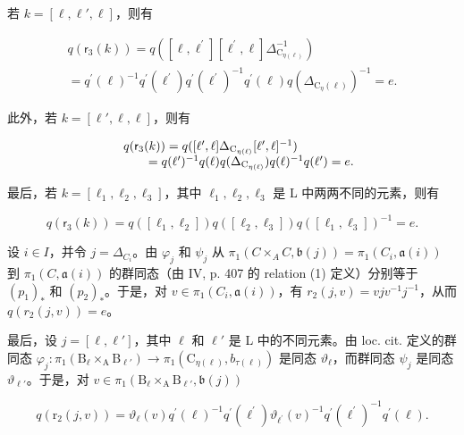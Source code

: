 若 \(k = [\ell, \ell', \ell]\)，则有

\[
\begin{array}{c} q (\mathsf {r} _ {3} (k)) = q ([ \ell , \ell^ {\prime} ] [ \ell^ {\prime}, \ell ] \Delta_ {\mathrm{C} _ {\eta (\ell)}} ^ {- 1}) \\ = q ^ {\prime} (\ell) ^ {- 1} q ^ {\prime} (\ell^ {\prime}) q ^ {\prime} (\ell^ {\prime}) ^ {- 1} q ^ {\prime} (\ell) q (\Delta_ {\mathrm{C} _ {\eta} (\ell)}) ^ {- 1} = e. \end{array}
\]

此外，若 \(k = [\ell', \ell, \ell]\)，则有

\[
\begin{array}{r l} & q (\mathsf {r} _ {3} (k)) = q ([ \ell^ {\prime}, \ell ] \Delta_ {\mathrm{C} _ {\eta (\ell)}} [ \ell^ {\prime}, \ell ] ^ {- 1}) \\ & \qquad = q (\ell^ {\prime}) ^ {- 1} q (\ell) q (\Delta_ {\mathrm{C} _ {\eta (\ell)}}) q (\ell) ^ {- 1} q (\ell^ {\prime}) = e. \end{array}
\]

最后，若 \(k = [\ell_{1}, \ell_{2}, \ell_{3}]\)，其中 \(\ell_{1}, \ell_{2}, \ell_{3}\) 是 L 中两两不同的元素，则有

\[
q (\mathsf {r} _ {3} (k)) = q ([ \ell_ {1}, \ell_ {2} ]) q ([ \ell_ {2}, \ell_ {3} ]) q ([ \ell_ {1}, \ell_ {3} ]) ^ {- 1} = e.
\]

设 \(i \in I\)，并令 \(j = \Delta_{C_i}\)。由 \(\varphi_j\) 和 \(\psi_j\) 从 \(\pi_1(C \times_A C, \mathfrak{b}(j)) = \pi_1(C_i, \mathfrak{a}(i))\) 到 \(\pi_1(C, \mathfrak{a}(i))\) 的群同态（由 IV, p. 407 的 relation (1) 定义）分别等于 \((p_1)_*\) 和 \((p_2)_*\)。于是，对 \(v \in \pi_1(C_i, \mathfrak{a}(i))\)，有 \(r_2(j, v) = v j v^{-1} j^{-1}\)，从而 \(q(r_2(j, v)) = e\)。

最后，设 \(j = [\ell, \ell']\)，其中 \(\ell\) 和 \(\ell'\) 是 L 中的不同元素。由 loc. cit. 定义的群同态 \(\varphi_j \colon \pi_1(\mathrm{B}_{\ell} \times_{\mathrm{A}} \mathrm{B}_{\ell'}) \to \pi_1(\mathrm{C}_{\eta(\ell)}, b_{\tau(\ell)})\) 是同态 \(\vartheta_\ell\)，而群同态 \(\psi_j\) 是同态 \(\vartheta_{\ell'}\)。于是，对 \(v \in \pi_1(\mathrm{B}_\ell \times_{\mathrm{A}} \mathrm{B}_{\ell'}, \mathfrak{b}(j))\)

\[
q \left(\mathrm{r} _ {2} (j, v)\right) = \vartheta_ {\ell} (v) q ^ {\prime} (\ell) ^ {- 1} q ^ {\prime} \left(\ell^ {\prime}\right) \vartheta_ {\ell^ {\prime}} (v) ^ {- 1} q ^ {\prime} \left(\ell^ {\prime}\right) ^ {- 1} q ^ {\prime} (\ell).
\]

